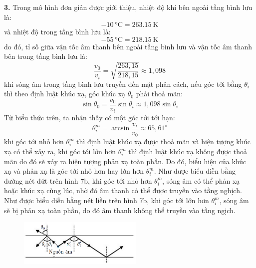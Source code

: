 \noindent\textbf{3.} Trong mô hình đơn giản được giới thiệu, nhiệt độ khí bên ngoài tầng bình lưu là:
\begin{equation*}
  \SI{-10}{\degreeCelsius}=\SI{263,15}{\kelvin}
\end{equation*}
và nhiệt độ trong tầng bình lưu là:
\begin{equation*}
  \SI{-55}{\degreeCelsius}=\SI{218,15}{\kelvin}
\end{equation*}
do đó, tỉ số giữa vận tốc âm thanh bên ngoài tầng bình lưu và vận tốc âm thanh bên trong tầng bình lưu là:
\begin{equation}
  \label{eq:713}
  \frac{v_{0}}{v_{i}}=\sqrt{\frac{263,15}{218,15}}\approx 1,098
\end{equation}
khi sóng âm trong tầng bình lưu truyền đến mặt phân cách, nếu góc tới bằng $\theta_{i}$ thì theo định luật khúc xạ, góc khúc xạ $\theta_{0}$ phải thoả mãn:
\begin{equation}
  \label{eq:714}
  \sin\theta_{0}=\frac{v_{0}}{v_{i}}\sin\theta_{i}\approx 1,098\sin\theta_{i}
\end{equation}
Từ biểu thức trên, ta nhận thấy có một góc tới tới hạn:
\begin{equation}
  \label{eq:715}
  \theta_{i}^{m}=\arcsin\frac{v_{i}}{v_{0}}\approx 65,61^{\circ}
\end{equation}
khi góc tới nhỏ hơn $\theta_{i}^{m}$ thì định luật khúc xạ được thoả mãn và hiện tượng khúc xạ có thể xảy ra, khi góc tói lớn hơn $\theta_{i}^{m}$ thì định luật khúc xạ không được thoả mãn do đó sẽ xảy ra hiện tượng phản xạ toàn phần. Do đó, biểu hiện của khúc xạ và phản xạ là góc tới nhỏ hơn hay lớn hơn $\theta_{i}^{m}$. Như được biểu diễn bằng đường nét đứt trên hình 7b, khi góc tới nhỏ hơn $\theta_{i}^{m}$, sóng âm có thể phản xạ hoặc khúc xạ cùng lúc, nhờ đó âm thanh có thể được truyền vào tầng nghịch. Như được biểu diễn bằng nét liền trên hình 7b, khi góc tới lớn hơn $\theta_{i}^{m}$, sóng âm sẽ bị phản xạ toàn phần, do đó âm thanh không thể truyền vào tầng ngịch.\\

\begin{figure}[h]
  \centering
  \includegraphics[width=0.53\textwidth]{images/Hinh 7b (S).png}
\end{figure}

